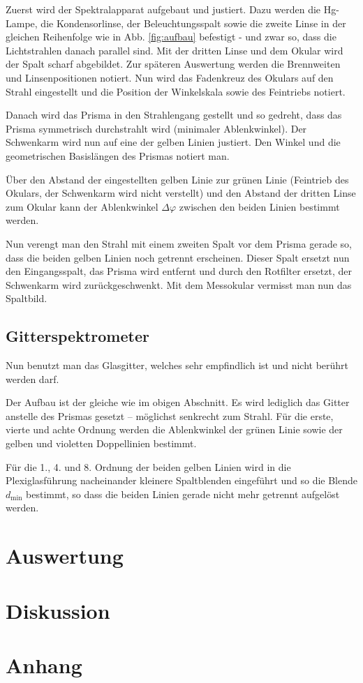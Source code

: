 \documentclass[12pt,a4paper,titlepage,headinclude,bibtotoc]{scrartcl}
\begin{document}
Zuerst wird der Spektralapparat aufgebaut und justiert.
Dazu werden die Hg-Lampe, die Kondensorlinse, der Beleuchtungsspalt sowie die zweite Linse in der gleichen Reihenfolge wie in Abb. \ref{fig:aufbau} befestigt - und zwar so, dass die Lichtstrahlen danach parallel sind.
Mit der dritten Linse und dem Okular wird der Spalt scharf abgebildet.
Zur späteren Auswertung werden die Brennweiten und Linsenpositionen notiert.
Nun wird das Fadenkreuz des Okulars auf den Strahl eingestellt und die Position der Winkelskala sowie des Feintriebs notiert.

Danach wird das Prisma in den Strahlengang gestellt und so gedreht, dass das Prisma symmetrisch durchstrahlt wird (minimaler Ablenkwinkel).
Der Schwenkarm wird nun auf eine der gelben Linien justiert.
Den Winkel und die geometrischen Basislängen des Prismas notiert man.

Über den Abstand der eingestellten gelben Linie zur grünen Linie (Feintrieb des Okulars, der Schwenkarm wird nicht verstellt) und den Abstand der dritten Linse zum Okular kann der Ablenkwinkel $\Delta\varphi$ zwischen den beiden Linien bestimmt werden.

Nun verengt man den Strahl mit einem zweiten Spalt vor dem Prisma gerade so, dass die beiden gelben Linien noch getrennt erscheinen.
Dieser Spalt ersetzt nun den Eingangsspalt, das Prisma wird entfernt und durch den Rotfilter ersetzt, der Schwenkarm wird zurückgeschwenkt.
Mit dem Messokular vermisst man nun das Spaltbild.

\subsection{Gitterspektrometer}
Nun benutzt man das Glasgitter, welches sehr empfindlich ist und nicht berührt werden darf.

Der Aufbau ist der gleiche wie im obigen Abschnitt.
Es wird lediglich das Gitter anstelle des Prismas gesetzt -- möglichst senkrecht zum Strahl.
Für die erste, vierte und achte Ordnung werden die Ablenkwinkel der grünen Linie sowie der gelben und violetten Doppellinien bestimmt.

Für die 1., 4. und 8. Ordnung der beiden gelben Linien wird in die Plexiglasführung nacheinander kleinere Spaltblenden eingeführt und so die Blende $d_\text{min}$ bestimmt, so dass die beiden Linien gerade nicht mehr getrennt aufgelöst werden.

\section{Auswertung}
\label{sec:auswertung}


\section{Diskussion}
\label{sec:diskussion}

\section{Anhang}



\end{document}

